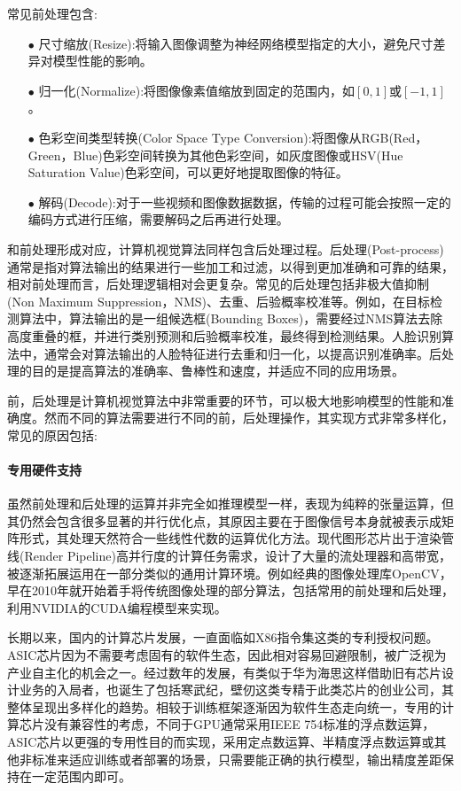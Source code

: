 \documentclass[master]{shtthesis}
\begin{document}
常见前处理包含:
\begin{itemize}
	\item[$\bullet$]尺寸缩放(Resize):将输入图像调整为神经网络模型指定的大小，避免尺寸差异对模型性能的影响。
	\item[$\bullet$]归一化(Normalize):将图像像素值缩放到固定的范围内，如$[0,1]$或$[-1,1]$。
	\item[$\bullet$]色彩空间类型转换(Color Space Type Conversion):将图像从RGB(Red，Green，Blue)色彩空间转换为其他色彩空间，如灰度图像或HSV(Hue Saturation Value)色彩空间，可以更好地提取图像的特征。
	\item[$\bullet$]解码(Decode):对于一些视频和图像数据数据，传输的过程可能会按照一定的编码方式进行压缩，需要解码之后再进行处理。
\end{itemize}

和前处理形成对应，计算机视觉算法同样包含后处理过程。后处理(Post-process)通常是指对算法输出的结果进行一些加工和过滤，以得到更加准确和可靠的结果，相对前处理而言，后处理逻辑相对会更复杂。常见的后处理包括非极大值抑制(Non Maximum Suppression，NMS)\cite{bodla2017soft}、去重、后验概率校准等。例如，在目标检测算法中，算法输出的是一组候选框(Bounding Boxes)，需要经过NMS算法去除高度重叠的框，并进行类别预测和后验概率校准，最终得到检测结果。人脸识别算法中，通常会对算法输出的人脸特征进行去重和归一化，以提高识别准确率。后处理的目的是提高算法的准确率、鲁棒性和速度，并适应不同的应用场景。

前，后处理是计算机视觉算法中非常重要的环节，可以极大地影响模型的性能和准确度。然而不同的算法需要进行不同的前，后处理操作，其实现方式非常多样化，常见的原因包括:
\paragraph{专用硬件支持}虽然前处理和后处理的运算并非完全如推理模型一样，表现为纯粹的张量运算，但其仍然会包含很多显著的并行优化点，其原因主要在于图像信号本身就被表示成矩阵形式，其处理天然符合一些线性代数的运算优化方法。现代图形芯片出于渲染管线(Render Pipeline)高并行度的计算任务需求，设计了大量的流处理器和高带宽，被逐渐拓展运用在一部分类似的通用计算环境。例如经典的图像处理库OpenCV\cite{bradski2000opencv}，早在2010年就开始着手将传统图像处理的部分算法，包括常用的前处理和后处理，利用NVIDIA的CUDA\cite{sanders2010cuda}编程模型来实现。

长期以来，国内的计算芯片发展，一直面临如X86指令集这类的专利授权问题。ASIC芯片因为不需要考虑固有的软件生态，因此相对容易回避限制，被广泛视为产业自主化的机会之一。经过数年的发展，有类似于华为海思这样借助旧有芯片设计业务的入局者，也诞生了包括寒武纪，壁仞这类专精于此类芯片的创业公司，其整体呈现出多样化的趋势。相较于训练框架逐渐因为软件生态走向统一，专用的计算芯片没有兼容性的考虑，不同于GPU通常采用IEEE 754标准的浮点数运算，ASIC芯片以更强的专用性目的而实现，采用定点数运算、半精度浮点数运算或其他非标准来适应训练或者部署的场景，只需要能正确的执行模型，输出精度差距保持在一定范围内即可。
\end{document}
